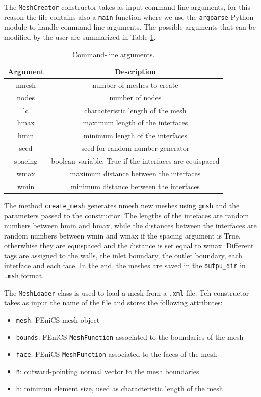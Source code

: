 \documentclass[11pt,a4paper]{article}
\begin{document}
The \texttt{MeshCreator} constructor takes as input command-line arguments, for this reason the file contains also a \texttt{main} function where we use the \texttt{argparse} Python module to handle command-line arguments. 
The possible arguments that can be modified by the user are summarized in Table \ref{args}.

\begin{table}[H]
    \centering
    \begin{tabular}{|c|c|}
        \hline
        \textbf{Argument} & \textbf{Description} \\
        \hline
        nmesh & number of meshes to create \\
        nodes & number of nodes \\
        lc & characteristic length of the mesh \\
        hmax & maximum length of the interfaces \\
        hmin & minimum length of the interfaces \\
        seed & seed for random number generator \\
        spacing & boolean variable, True if the interfaces are equispaced \\
        wmax & maximum distance between the interfaces \\
        wmin & minimum distance between the interfaces \\
        \hline   
    \end{tabular}
    \caption{Command-line arguments.}
    \label{args}
\end{table}

The method \texttt{create\_mesh} generates nmesh new meshes using \texttt{gmsh} and the parameters passed to the constructor. The lengths of the intefaces are random numbers between hmin and hmax, while the distances between the interfaces are random numbers between wmin and wmax if the spacing argument is True, otherwhise they are equispaced and the distance is set equal to wmax. Different tags are assigned to the walls, the inlet boundary, the outlet boundary, each interface and each face. In the end, the meshes are saved in the \texttt{outpu\_dir} in \texttt{.msh} format.


The \texttt{MeshLoader} class is used to load a mesh from a \texttt{.xml} file. Teh constructor takes as input the name of the file and stores the following attributes:
\begin{itemize}
    \item \texttt{mesh}: FEniCS mesh object
    \item \texttt{bounds}: FEniCS \texttt{MeshFunction} associated to the boundaries of the mesh
    \item \texttt{face}: FEniCS \texttt{MeshFunction} associated to the faces of the mesh
    \item \texttt{n}: outward-pointing normal vector to the mesh boundaries
    \item \texttt{h}: minimun element size, used as characteristic length of the mesh
\end{itemize}
\end{document}

